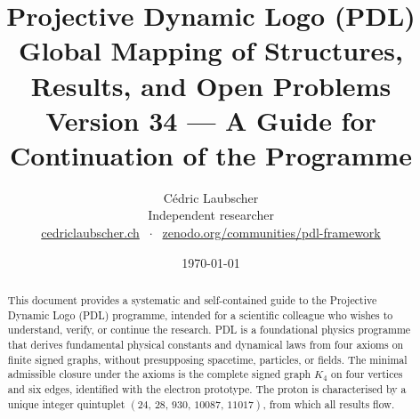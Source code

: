\documentclass[11pt,a4paper]{article}
\title{Projective Dynamic Logo (PDL)\\[4pt]
\large Global Mapping of Structures, Results, and Open Problems\\[2pt]
\normalsize Version 34 --- A Guide for Continuation of the Programme}
\author{C\'edric Laubscher\\[4pt]
\small Independent researcher\\
\small \href{https://cedriclaubscher.ch}{cedriclaubscher.ch}
$\;\cdot\;$
\small \href{https://zenodo.org/communities/pdl-framework/}{zenodo.org/communities/pdl-framework}}
\date{\today}
\theoremstyle{plain}
\theoremstyle{definition}
\theoremstyle{remark}
\newcommand{\Kfour}{K_4}
\newcommand{\quintuplet}{(24,\,28,\,930,\,10087,\,11017)}
\begin{document}
\maketitle
\setcounter{tocdepth}{2}

\begin{abstract}
This document provides a systematic and self-contained guide to the Projective Dynamic Logo (PDL) programme, intended for a scientific colleague who wishes to understand, verify, or continue the research. PDL is a foundational physics programme that derives fundamental physical constants and dynamical laws from four axioms on finite signed graphs, without presupposing spacetime, particles, or fields. The minimal admissible closure under the axioms is the complete signed graph $\Kfour$ on four vertices and six edges, identified with the electron prototype. The proton is characterised by a unique integer quintuplet $\quintuplet$, from which all results flow.


\end{abstract}
\end{document}
